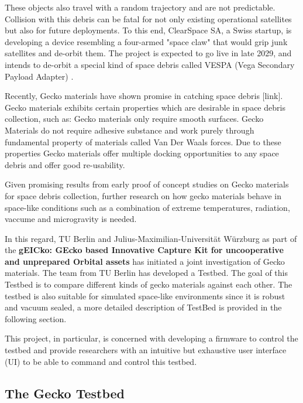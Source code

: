 \documentclass[
    twocolumn,
    fontsize = 10pt,
    parskip = half+,
    headings = small,
    headwidth = text,
    footwidth = text,
]{scrartcl}
\begin{document}
These objects also travel with a random trajectory and are not predictable. Collision with this debris can be fatal for not only existing operational satellites but also for future deployments. To this end, ClearSpace SA, a Swiss startup, is developing a device resembling a four-armed "space claw" that would grip junk satellites and de-orbit them. The project is expected to go live in late 2029, and intends to de-orbit a special kind of space debris called VESPA (Vega Secondary Payload Adapter) \cite{clear_space}. 

Recently, Gecko materials have shown promise in catching space debris [link]. Gecko materials exhibits certain properties which are desirable in space debris collection, such as: Gecko materials only require smooth surfaces. Gecko Materials do not require adhesive substance and work purely through fundamental property of materials called Van Der Waals forces. Due to these properties Gecko materials offer multiple docking opportunities to any space debris and offer good re-usability.

Given promising results from early proof of concept studies on Gecko materials for space debris collection, further research on how gecko materials behave in space-like conditions such as a combination of extreme temperatures, radiation, vaccume and microgravity is needed. 

In this regard, TU Berlin and Julius-Maximilian-Universität Würzburg as part of the \textbf{gEICko: GEcko based Innovative Capture Kit for uncooperative and unprepared Orbital assets} has initiated a joint investigation of Gecko materials. The team from TU Berlin has developed a Testbed. The goal of this Testbed is to compare different kinds of gecko materials against each other. The testbed is also suitable for simulated space-like environments since it is robust and vacuum sealed, a more detailed description of TestBed is provided in the following section.

This project, in particular, is concerned with developing a firmware to control the testbed and provide researchers with an intuitive but exhaustive user interface (UI) to be able to command and control this testbed.

\subsection{The Gecko Testbed}
\end{document}
